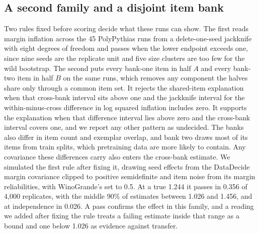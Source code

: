 \subsection{A second family and a disjoint item bank}
\label{sec:family}
Two rules fixed before scoring decide what these runs can show. The first reads margin inflation across the 45 PolyPythias runs from a delete-one-seed jackknife with eight degrees of freedom and passes when the lower endpoint exceeds one, since nine seeds are the replicate unit and five size clusters are too few for the wild bootstrap. The second puts every bank-one item in half $A$ and every bank-two item in half $B$ on the same runs, which removes any component the halves share only through a common item set. It rejects the shared-item explanation when that cross-bank interval sits above one and the jackknife interval for the within-minus-cross difference in log squared inflation includes zero. It supports the explanation when that difference interval lies above zero and the cross-bank interval covers one, and we report any other pattern as undecided. The banks also differ in item count and exemplar overlap, and bank two draws most of its items from train splits, which pretraining data are more likely to contain. Any covariance these differences carry also enters the cross-bank estimate. We simulated the first rule after fixing it, drawing seed effects from the DataDecide margin covariance clipped to positive semidefinite and item noise from its margin reliabilities, with WinoGrande's set to 0.5. At a true 1.244 it passes in 0.356 of 4,000 replicates, with the middle 90\% of estimates between 1.026 and 1.456, and at independence in 0.026. A pass confirms the effect in this family, and a reading we added after fixing the rule treats a failing estimate inside that range as a bound and one below 1.026 as evidence against transfer.


